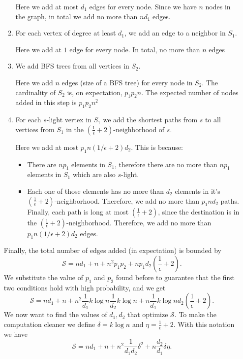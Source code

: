\documentclass[11pt]{article}
\begin{document}
\begin{enumerate}
\begin{enumerate}
            Here we add at most $d_1$ edges for every node. Since we have $n$ nodes in the graph, in total we add no more than $nd_1$ edges.
            \item For each vertex of degree at least $d_1$, we add an edge to a neighbor in $S_1$.
            
            Here we add at $1$ edge for every node. In total, no more than $n$ edges
            \item We add BFS trees from all vertices in $S_2$.
            
            Here we add $n$ edges (size of a BFS tree) for every node in $S_2$. The cardinality of $S_2$ is, on expectation, $p_1p_2n$. The expected number of nodes added in this step is $p_1p_2n^2$
            \item For each $s$-light vertex in $S_1$ we add the shortest paths from $s$ to all vertices from $S_1$ in the $\left(\frac{1}{\epsilon} + 2\right)$-neighborhood of $s$. 
            
            Here we add at most $p_1n (1/\epsilon + 2)d_2$. This is because:
            \begin{itemize}
                \item There are $np_1$ elements in $S_1$, therefore there are no more than $np_1$ elements in $S_1$ which are also $s$-light.
                \item Each one of those elements has no more than $d_2$ elements in it's $\left(\frac{1}{\epsilon} + 2\right)$-neighborhood. Therefore, we add no more than $p_1nd_2$ paths. Finally, each path is long at most $\left(\frac{1}{\epsilon} + 2\right)$, since the destination is in the $\left(\frac{1}{\epsilon} + 2\right)$-neighborhood. Therefore, we add no more than $p_1n (1/\epsilon + 2)d_2$ edges.
            \end{itemize}
    \end{enumerate}
    Finally, the total number of edges added (in expectation) is bounded by 
    \begin{equation*}
        \mathcal{S} = nd_1 + n + n^2p_1p_2 + np_1d_2\left(\frac{1}{\epsilon}+2\right).
    \end{equation*}
    We substitute the value of $p_1$ and $p_2$ found before to guarantee that the first two conditions hold with high probability, and we get
    \begin{equation*}
        \mathcal{S} = nd_1 + n + n^2\frac{1}{d_1}k\log n\frac{1}{d_2}k\log n + n\frac{1}{d_1}k\log n d_2\left(\frac{1}{\epsilon}+2\right).
    \end{equation*}
    We now want to find the values of $d_1,d_2$ that optimize $\mathcal{S}$. To make the computation cleaner we define $\delta = k\log n$ and $\eta = \frac{1}{\epsilon} + 2$. With this notation we have
    \begin{equation*}
        \mathcal{S} = nd_1 + n + n^2\frac{1}{d_1d_2}\delta ^2 + n\frac{d_2}{d_1}\delta \eta.
    \end{equation*}
    

\end{enumerate}
\end{document}
